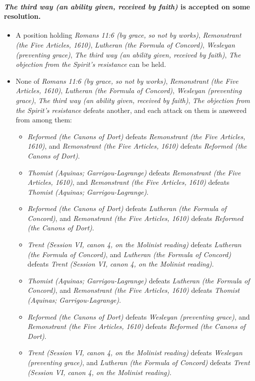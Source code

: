 \documentclass[11pt]{article}
\begin{document}
\paragraph{\emph{The third way (an ability given, received by faith)} is accepted on some resolution.}
\begin{itemize}
\item A position holding \emph{Romans 11:6 (by grace, so not by works)}, \emph{Remonstrant (the Five Articles, 1610)}, \emph{Lutheran (the Formula of Concord)}, \emph{Wesleyan (preventing grace)}, \emph{The third way (an ability given, received by faith)}, \emph{The objection from the Spirit’s resistance} can be held.
\item None of \emph{Romans 11:6 (by grace, so not by works)}, \emph{Remonstrant (the Five Articles, 1610)}, \emph{Lutheran (the Formula of Concord)}, \emph{Wesleyan (preventing grace)}, \emph{The third way (an ability given, received by faith)}, \emph{The objection from the Spirit’s resistance} defeats another, and each attack on them is answered from among them:
\begin{itemize}
\item \emph{Reformed (the Canons of Dort)} defeats \emph{Remonstrant (the Five Articles, 1610)}, and \emph{Remonstrant (the Five Articles, 1610)} defeats \emph{Reformed (the Canons of Dort)}.
\item \emph{Thomist (Aquinas; Garrigou-Lagrange)} defeats \emph{Remonstrant (the Five Articles, 1610)}, and \emph{Remonstrant (the Five Articles, 1610)} defeats \emph{Thomist (Aquinas; Garrigou-Lagrange)}.
\item \emph{Reformed (the Canons of Dort)} defeats \emph{Lutheran (the Formula of Concord)}, and \emph{Remonstrant (the Five Articles, 1610)} defeats \emph{Reformed (the Canons of Dort)}.
\item \emph{Trent (Session VI, canon 4, on the Molinist reading)} defeats \emph{Lutheran (the Formula of Concord)}, and \emph{Lutheran (the Formula of Concord)} defeats \emph{Trent (Session VI, canon 4, on the Molinist reading)}.
\item \emph{Thomist (Aquinas; Garrigou-Lagrange)} defeats \emph{Lutheran (the Formula of Concord)}, and \emph{Remonstrant (the Five Articles, 1610)} defeats \emph{Thomist (Aquinas; Garrigou-Lagrange)}.
\item \emph{Reformed (the Canons of Dort)} defeats \emph{Wesleyan (preventing grace)}, and \emph{Remonstrant (the Five Articles, 1610)} defeats \emph{Reformed (the Canons of Dort)}.
\item \emph{Trent (Session VI, canon 4, on the Molinist reading)} defeats \emph{Wesleyan (preventing grace)}, and \emph{Lutheran (the Formula of Concord)} defeats \emph{Trent (Session VI, canon 4, on the Molinist reading)}.

\end{itemize}
\end{itemize}
\end{document}
